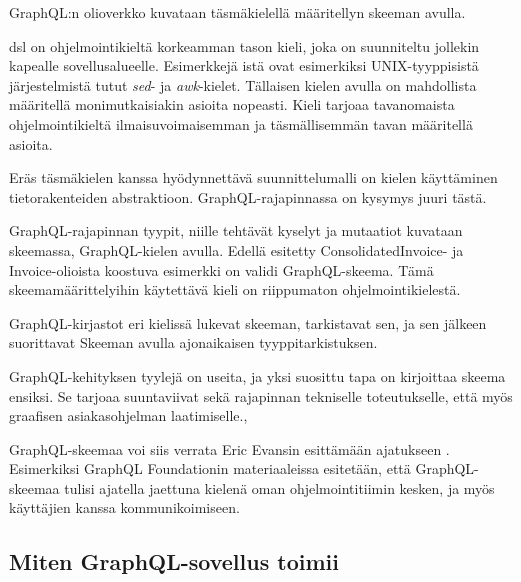 GraphQL:n olioverkko kuvataan täsmäkielellä määritellyn skeeman avulla.

\Gls{dsl} on ohjelmointikieltä korkeamman tason kieli, joka on
suunniteltu jollekin kapealle sovellusalueelle.\cite{landin1966next}
Esimerkkejä istä ovat esimerkiksi UNIX-tyyppisistä
järjestelmistä tutut \emph{sed}- ja \emph{awk}-kielet. Tällaisen kielen
avulla on mahdollista määritellä monimutkaisiakin asioita
nopeasti.\cite{Raymond2003} Kieli tarjoaa tavanomaista ohjelmointikieltä
ilmaisuvoimaisemman ja täsmällisemmän tavan määritellä asioita.

Eräs täsmäkielen kanssa hyödynnettävä suunnittelumalli on kielen
käyttäminen tietorakenteiden abstraktioon.\cite{Spi00b}
GraphQL-rajapinnassa on kysymys juuri tästä.

GraphQL-rajapinnan tyypit, niille tehtävät kyselyt ja mutaatiot kuvataan
skeemassa, GraphQL-kielen avulla. Edellä esitetty ConsolidatedInvoice-
ja Invoice-olioista koostuva esimerkki on validi GraphQL-skeema. Tämä
skeemamäärittelyihin käytettävä kieli on riippumaton
ohjelmointikielestä.

GraphQL-kirjastot eri kielissä lukevat skeeman, tarkistavat sen, ja sen
jälkeen suorittavat Skeeman avulla ajonaikaisen tyyppitarkistuksen.

GraphQL-kehityksen tyylejä on useita, ja yksi suosittu tapa on
kirjoittaa skeema ensiksi. Se tarjoaa suuntaviivat sekä rajapinnan
tekniselle toteutukselle, että myös graafisen asiakasohjelman
laatimiselle.\cite{SchemaDriven2017Nov},\cite{SchemaDrivenDesign2021Jul}

GraphQL-skeemaa voi siis verrata Eric Evansin esittämään ajatukseen
. Esimerkiksi GraphQL
Foundationin materiaaleissa esitetään, että GraphQL-skeemaa tulisi
ajatella jaettuna kielenä oman ohjelmointitiimin kesken, ja myös
käyttäjien kanssa kommunikoimiseen.\cite{thinkingInGraphs}

\hypertarget{miten-graphql-sovellus-toimii}{%
\subsection{Miten GraphQL-sovellus
toimii}\label{miten-graphql-sovellus-toimii}}

